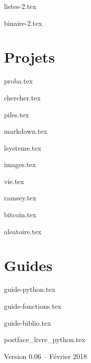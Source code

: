 \documentclass[11pt]{report}
\begin{document}
{listes-2.tex}

{binaire-2.tex}



\part{Projets}

{proba.tex}

{chercher.tex}

{piles.tex}

{markdown.tex}

{lsysteme.tex}

{images.tex}

{vie.tex}

{ramsey.tex}

{bitcoin.tex}

{aleatoire.tex}






\part{Guides}

{guide-python.tex}

{guide-fonctions.tex}

{guide-biblio.tex}



\clearemptydoublepage


{postface_livre_python.tex}

\vfill
\bigskip
\bigskip

\centerline{Version 0.06 -- Février 2018}
\end{document}

